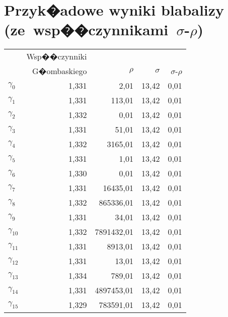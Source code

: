 \documentclass[licencjacka]{pracamgr}
\begin{document}
\chapter{Przyk�adowe wyniki blabalizy
    (ze~wsp��czynnikami~$\sigma$-$\rho$)}

\begin{center}
  \begin{tabular}{lrrrr}
    & Wsp��czynniki \\
    & G�ombaskiego & $\rho$ & $\sigma$ & $\sigma$-$\rho$\\
    $\gamma_{0}$ & 1,331 & 2,01 & 13,42 & 0,01 \\
    $\gamma_{1}$ & 1,331 & 113,01 & 13,42 & 0,01 \\
    $\gamma_{2}$ & 1,332 & 0,01 & 13,42 & 0,01 \\
    $\gamma_{3}$ & 1,331 & 51,01 & 13,42 & 0,01 \\
    $\gamma_{4}$ & 1,332 & 3165,01 & 13,42 & 0,01 \\
    $\gamma_{5}$ & 1,331 & 1,01 & 13,42 & 0,01 \\
    $\gamma_{6}$ & 1,330 & 0,01 & 13,42 & 0,01 \\
    $\gamma_{7}$ & 1,331 & 16435,01 & 13,42 & 0,01 \\
    $\gamma_{8}$ & 1,332 & 865336,01 & 13,42 & 0,01 \\
    $\gamma_{9}$ & 1,331 & 34,01 & 13,42 & 0,01 \\
    $\gamma_{10}$ & 1,332 & 7891432,01 & 13,42 & 0,01 \\
    $\gamma_{11}$ & 1,331 & 8913,01 & 13,42 & 0,01 \\
    $\gamma_{12}$ & 1,331 & 13,01 & 13,42 & 0,01 \\
    $\gamma_{13}$ & 1,334 & 789,01 & 13,42 & 0,01 \\
    $\gamma_{14}$ & 1,331 & 4897453,01 & 13,42 & 0,01 \\
    $\gamma_{15}$ & 1,329 & 783591,01 & 13,42 & 0,01 \\
  \end{tabular}
\end{center}
\end{document}
